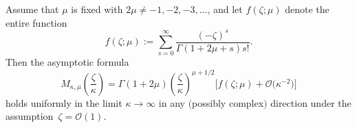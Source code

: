 \begin{Lemma}\label{lem:M-expansion}
Assume that $\mu$ is fixed with $2\mu\neq -1,-2,-3,\dots$, and let $f(\zeta;\mu)$ denote the entire function
\begin{equation}
 f(\zeta;\mu):=\sum_{s=0}^\infty \frac{(-\zeta)^s}{\Gamma(1+2\mu+s)s!}.
\label{eq:Bessel-f-define}
\end{equation}
Then the asymptotic formula
\begin{equation*}%
 M_{\kappa,\mu}\left(\frac{\zeta}{\kappa}\right) = \Gamma(1+2\mu)\left(\frac{\zeta}{\kappa}\right)^{\mu+1/2}\big[f(\zeta;\mu) + \mathcal{O}\big(\kappa^{-2}\big)\big]
\end{equation*}
holds uniformly in the limit $\kappa\to\infty$ in any $($possibly complex$)$ direction under the assumption~${\zeta=\mathcal{O}(1)}$.
\end{Lemma}
